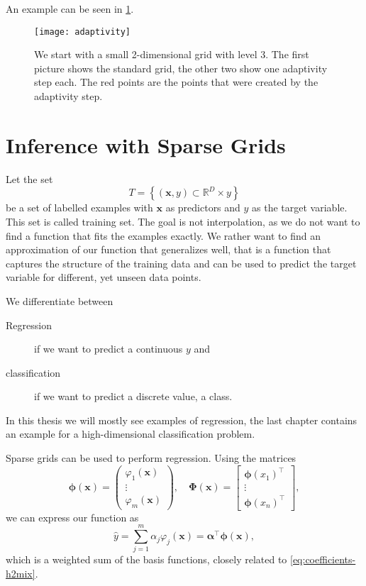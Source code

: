 An example can be seen in \cref{fig:adaptivity}.

\begin{figure}[thb]
\texttt{[image: adaptivity]}
 \caption[Adaptivity]{We start with a small 2-dimensional grid with level 3. The first
   picture shows the standard grid, the other two show one adaptivity step each.
 The red points are the points that were created by the adaptivity step.}\label{fig:adaptivity}
\end{figure}

\section{Inference with Sparse Grids}

Let the set 
\begin{equation*}
T = \left\{ \left(  \bm{x}, y \right) \subset \mathbb{R}^D \times y \right\} 
\end{equation*}
be a set of labelled examples with \(\bm{x}\) as predictors and \(y\) as the target variable. 
This set is called training set.
The goal is not interpolation, as we do not want to find a function that fits the examples exactly.
We rather want to find an approximation of our function that generalizes well,
that is a function that captures the structure of the training data and can be
used to predict the target variable for different, yet unseen data points.

We differentiate between
\begin{description}
\item[Regression] if we want to predict a continuous \(y\) and
\item[classification] if we want to predict a discrete value, a class.
\end{description}
In this thesis we will mostly see examples of regression, the last chapter
contains an example for a high-dimensional classification problem.

Sparse grids can be used to perform regression.
Using the matrices
\begin{equation*}
\boldsymbol{\phi}(\boldsymbol{x}) = \begin{pmatrix}
  \varphi_1(\bm{x}) \\
  \vdots \\
  \varphi_m(\bm{x})
\end{pmatrix}
, \quad
\boldsymbol{\Phi}(\boldsymbol{x}) = \begin{bmatrix}
  \boldsymbol{\phi}(x_1)^\intercal\\
  \vdots \\
  \boldsymbol{\phi}(x_n)^\intercal
\end{bmatrix},
\end{equation*}
we can express our function as
\begin{equation*}
\hat{y} = \sum_{j = 1}^m \alpha_j \varphi_{j}(\bm{x}) = \boldsymbol{\alpha}^\intercal \bm{\phi} (\bm{x}),
\end{equation*}
which is a weighted sum of the basis functions, closely related to \cref{eq:coefficients-h2mix}.

